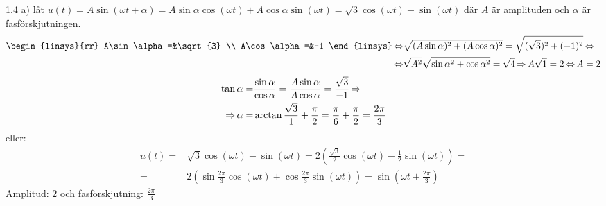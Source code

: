 \pagebreak
\begin{task}{1.4 a)}
	låt $u(t)=A\sin(\omega t + \alpha)=A\sin\alpha\cos(\omega t)+A\cos\alpha\sin(\omega t)=\sqrt{3}\cos(\omega t)-\sin(\omega t)$ där $A$ är amplituden och $\alpha$ är fasförskjutningen.
	\begin{align*}
		\begin{linsys}{rr}
		A\sin\alpha=&\sqrt{3} \\
		A\cos\alpha=&-1
		\end{linsys} \lra &
		\sqrt{(A\sin\alpha)^2+(A\cos\alpha)^2}=\sqrt{(\sqrt{3})^2+(-1)^2} \lra \\ \lra
		& \sqrt{A^2}\sqrt{\sin\alpha^2+\cos\alpha^2}=\sqrt{4} \ra
		A\sqrt{1}=2 \lra
		A=2
	\end{align*}
	\begin{align*}
		\tan\alpha= &
		\frac{\sin\alpha}{\cos\alpha}=
		\frac{A\sin\alpha}{A\cos\alpha}=
		\frac{\sqrt{3}}{-1} \operatorname{\Rightarrow} \\ \operatorname{\Rightarrow}
		\alpha= &
		\arctan\frac{\sqrt{3}}{1}+\frac{\pi}{2}=
		\frac{\pi}{6}+\frac{\pi}{2}=
		\frac{2\pi}{3}
	\end{align*}
	eller:
	\begin{align*}
		u(t)= &
		\sqrt{3}\cos(\omega t)-\sin(\omega t)=
		2(\frac{\sqrt{3}}{2}\cos(\omega t)-\frac{1}{2}\sin(\omega t))= \\ =
		& 2(\sin\frac{2\pi}{3}\cos(\omega t)+\cos\frac{2\pi}{3}\sin(\omega t))=
		\sin(\omega t + \frac{2\pi}{3})
	\end{align*}
	\ans Amplitud: $2$ och fasförskjutning: $\frac{2\pi}{3}$
\end{task}